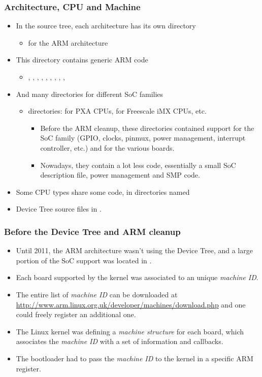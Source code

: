\begin{frame}
  \frametitle{Architecture, CPU and Machine}
  \begin{itemize}
  \item In the source tree, each architecture has its own directory
    \begin{itemize}
    \item {} for the ARM architecture
    \end{itemize}
  \item This directory contains generic ARM code
    \begin{itemize}
    \item {}, , , ,
      , , , ,
      , 
    \end{itemize}
  \item And many directories for different SoC families
    \begin{itemize}
    \item {} directories:  for PXA CPUs,
       for Freescale iMX CPUs, etc.
      \begin{itemize}
      \item Before the ARM cleanup, these directories contained
        support for the SoC family (GPIO, clocks, pinmux, power
        management, interrupt controller, etc.) and for the various
        boards.
      \item Nowadays, they contain a lot less code, essentially a
        small SoC description file, power management and SMP code.
      \end{itemize}
    \end{itemize}
  \item Some CPU types share some code, in directories named
  \item Device Tree source files in .
  \end{itemize}
\end{frame}

\begin{frame}
  \frametitle{Before the Device Tree and ARM cleanup}
  \begin{itemize}
  \item Until 2011, the ARM architecture wasn't using the Device Tree,
    and a large portion of the SoC support was located in
    .
  \item Each board supported by the kernel was associated to an unique
    {\em machine ID}.
  \item The entire list of {\em machine ID} can be downloaded at
    \url{http://www.arm.linux.org.uk/developer/machines/download.php}
    and one could freely register an additional one.
  \item The Linux kernel was defining a {\em machine structure} for
    each board, which associates the {\em machine ID} with a set of
    information and callbacks.
  \item The bootloader had to pass the {\em machine ID} to the kernel
    in a specific ARM register.
  \end{itemize}
\end{frame}

